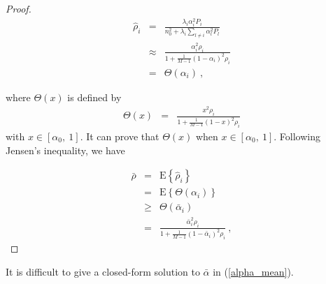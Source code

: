 \documentclass[a4paper,10pt,fleqn, twocolumn]{IEEEtran}
\begin{document}
\begin{proof}

\begin{equation}
\begin{array}{rcl}
\hat{\rho}_{i}&=&\frac{\lambda_{i}\alpha_{i}^{2}P_{i}}{n_{0}^2+
\lambda_{i}\sum\limits_{l\neq i}\alpha_{l}^{2}P_{l}}\\
&\approx&\frac{\alpha_{i}^{2}\rho_{i}}{1+
\frac{1}{M-1}\left(1-\alpha_{i}\right)^{2}\rho_{i}}\\
&=&\Theta\left(\alpha_{i}\right)\ ,
\end{array}
\end{equation}

\noindent where $\Theta\left(x\right)$ is defined by
\begin{equation}
\begin{array}{rcl}
\Theta\left(x\right)&=&\frac{x^{2}\rho_{i}}{1+
\frac{1}{M-1}\left(1-x\right)^{2}\rho_{i}}
\end{array}
\end{equation}
\noindent with $x\in\left[\alpha_{0},\ 1\right]$. It can prove
that $\Theta\left(x\right)$ when $x\in\left[\alpha_{0},\
1\right]$. Following Jensen's inequality, we have

\begin{equation}
\begin{array}{rcl}
\bar{\rho}&=&\mbox{E}\left\{\hat{\rho}_{i}\right\} \\
&=&\mbox{E}\left\{\Theta\left(\alpha_{i}\right)\right\}\\
&\geq&\Theta\left(\bar\alpha_{i}\right)\\
&=& \frac{\bar\alpha_{i}^{2}\rho_{i}}{1+
\frac{1}{M-1}\left(1-\bar\alpha_{i}\right)^{2}\rho_{i}}\ ,
\end{array}
\end{equation}

\end{proof}

It is difficult to give a closed-form solution to $\bar{\alpha}$
in (\ref{alpha_mean}).
\end{document}
